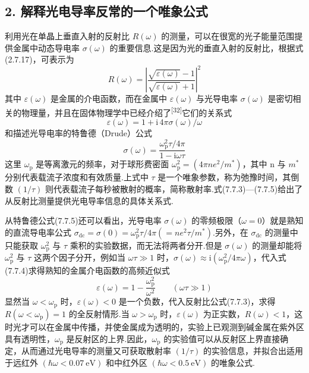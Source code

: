 \subsection*{2. 解释光电导率反常的一个唯象公式}

利用光在单晶上垂直入射的反射比 $R(\omega)$ 的测量，可以在很宽的光子能量范围提供金属中动态导电率 $\sigma(\omega)$ 的重要信息.这是因为光的垂直入射的反射比，根据式(2.7.17)，可表示为
\begin{equation}
  R(\omega)=\left|\frac{\sqrt{\varepsilon(\omega)}-1}{\sqrt{\varepsilon(\omega)}+1}\right|^{2}
\end{equation}
其中 $\varepsilon(\omega)$ 是金属的介电函数，而在金属中 $\varepsilon(\omega)$ 与光导电率 $\sigma(\omega)$ 是密切相关的物理量，并且在固体物理学中已经介绍了\textsuperscript{[32]}它们的关系式
\begin{equation}
  \varepsilon(\omega)=1+\mathrm{i}\,4\pi\sigma(\omega)/\omega
\end{equation}
和描述光导电率的特鲁德（Drude）公式
\begin{equation}
  \sigma(\omega)=\frac{\omega_{\mathrm{p}}^{2}\tau/4\pi}{1-\mathrm{i}\omega\tau}
\end{equation}
这里 $\omega_{\mathrm{p}}$ 是等离激元的频率，对于球形费密面 $\omega_{\mathrm{p}}^{2}=\left(4\pi ne^{2}/m^{*}\right)$，其中 n 与 $m^{*}$ 分别代表载流子浓度和有效质量.上式中 $\tau$ 是一个唯象参数，称为弛豫时间，其倒数 $\left(1/\tau\right)$ 则代表载流子每秒被散射的概率，简称散射率.式(7.7.3)—(7.7.5)给出了从反射比测量提供光电导率信息的具体关系式.

从特鲁德公式(7.7.5)还可以看出，光导电率 $\sigma(\omega)$ 的零频极限（$\omega=0$）就是熟知的直流导电率公式 $\sigma_{\mathrm{dc}}=\sigma(0)=\omega_{\mathrm{p}}^{2}\tau/4\pi\left(=ne^{2}\tau/m^{*}\right)$.另外，在 $\sigma_{\mathrm{dc}}$ 的测量中只能获取 $\omega_{\mathrm{p}}^{2}$ 与 $\tau$ 乘积的实验数据，而无法将两者分开.但是 $\sigma(\omega)$ 的测量却能将 $\omega_{\mathrm{p}}^{2}$ 与 $\tau$ 这两个因子分开，例如当 $\omega\tau\gg1$ 时，$\sigma(\omega)\approx\mathrm{i}\left(\omega_{\mathrm{p}}^{2}/4\pi\omega\right)$，代入式(7.7.4)求得熟知的金属介电函数的高频近似式
\begin{equation}
  \varepsilon(\omega)=1-\frac{\omega_{\mathrm{p}}^{2}}{\omega^{2}}\qquad\left(\omega\tau\gg1\right)
\end{equation}
显然当 $\omega<\omega_{\mathrm{p}}$ 时，$\varepsilon(\omega)<0$ 是一个负数，代入反射比公式(7.7.3)，求得 $R\left(\omega<\omega_{\mathrm{p}}\right)=1$ 的全反射情形.当 $\omega>\omega_{\mathrm{p}}$ 时，$\varepsilon(\omega)$ 为正实数，$R(\omega)<1$，这时光才可以在金属中传播，并使金属成为透明的，实验上已观测到碱金属在紫外区具有透明性，$\omega_{\mathrm{p}}$ 是反射区的上界.因此，$\omega_{\mathrm{p}}$ 的实验值可以从反射区上界直接确定，从而通过光电导率的测量又可获取散射率 $\left(1/\tau\right)$ 的实验信息，并拟合出适用于远红外 $\left(\hbar\omega<0.07\ \mathrm{eV}\right)$ 和中红外区 $\left(\hbar\omega<0.5\ \mathrm{eV}\right)$ 的唯象公式.

